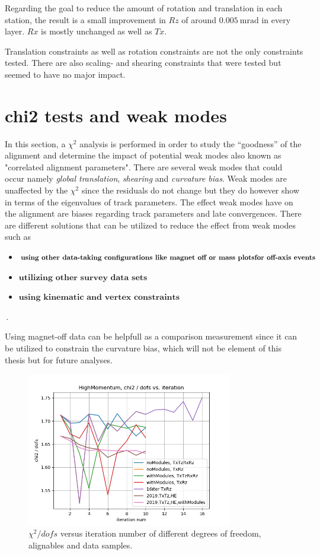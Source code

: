 Regarding the goal to reduce the amount of rotation and translation in each station,
the result is a small improvement in $Rz$ of around $\SI{0.005}{\milli\radian}$ in every layer. $Rx$ is mostly unchanged as well as $Tx$.

Translation constraints as well as rotation constraints are not the only constraints tested. There are also scaling- and shearing constraints that were tested but seemed to have no major impact.

\section{chi2 tests and weak modes}
In this section, a $\chi^2$ analysis is performed in order to study the ``goodness'' of the alignment and determine the impact of potential weak modes also known as "correlated alignment parameters". There are several weak modes that could occur namely \textit{global translation}, \textit{shearing} and \textit{curvature bias}.
Weak modes are unaffected by the $\chi^2$ since the residuals do not change but they do however show in terms of the eigenvalues of track parameters.
The effect weak modes have on the alignment are biases regarding track parameters and late convergences.
There are different solutions that can be utilized to reduce the effect from weak modes such as
\begin{itemize}
  \item $\textbf{using other data-taking configurations like magnet off or mass plots \\for off-axis events}$
  \item $\textbf{utilizing other survey data sets}$
  \item $\textbf{using kinematic and vertex constraints}$
\end{itemize}\,.

Using magnet-off data can be helpfull as a comparison measurement since it can be utilized to constrain the curvature bias, which will not be element of this thesis but for future analyses.

\begin{figure}
  \centering
  \includegraphics[width=0.8\textwidth]{plots/nov_19/Figure_2.png}
  \caption{$\chi^2 / dofs$ versus iteration number of different degrees of freedom, alignables and data samples.}
  \label{fig:fig2}
\end{figure}

